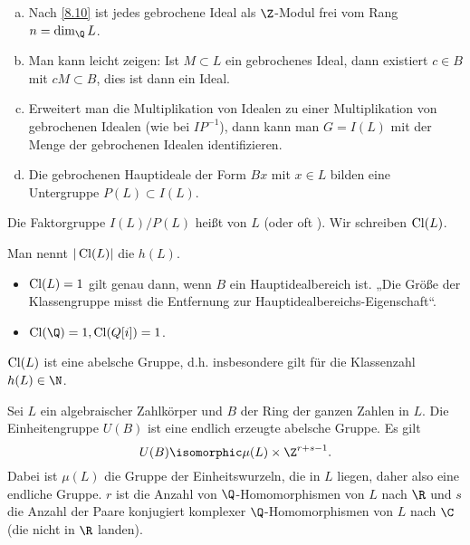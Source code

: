 \begin{nt} \label{8.24}
	\begin{enumerate}[a)]
		\item
			Nach \ref{8.10} ist jedes gebrochene Ideal als $\Z$-Modul frei vom Rang $n = \dim_{\Q} L$.
		\item
			Man kann leicht zeigen:
			Ist $M \subset L$ ein gebrochenes Ideal, dann existiert $c \in B$ mit $cM \subset B$, dies ist dann ein Ideal.
		\item
			Erweitert man die Multiplikation von Idealen zu einer Multiplikation von gebrochenen Idealen (wie bei $IP^{-1}$), dann kann man $G = I(L)$ mit der Menge der gebrochenen Idealen identifizieren.
		\item
			Die gebrochenen Hauptideale der Form $B x$ mit $x \in L$ bilden eine Untergruppe $P(L) \subset I(L)$.
	\end{enumerate}
\end{nt}

\begin{df} \label{8.25}
	Die Faktorgruppe $I(L) / P(L)$ heißt  von $L$ (oder oft ).
	Wir schreiben $\operatorname{Cl}(L)$.

	Man nennt $|\operatorname{Cl}(L)|$ die  $h(L)$.
\end{df}

\begin{nt} \label{8.26}
	\begin{itemize}
		\item
			$\operatorname{Cl}(L) = 1$ gilt genau dann, wenn $B$ ein Hauptidealbereich ist.
			„Die Größe der Klassengruppe misst die Entfernung zur Hauptidealbereichs-Eigenschaft“.
		\item
			$\Cl(\Q) = 1, \Cl(Q[i]) = 1$.
	\end{itemize}
\end{nt}

\begin{st}[Hauptsatz] \label{8.27}
	$\operatorname{Cl}(L)$ ist eine  abelsche Gruppe, d.h. insbesondere gilt für die Klassenzahl $h(L) \in \N$.
\end{st}

\begin{st} \label{8.28}
	Sei $L$ ein algebraischer Zahlkörper und $B$ der Ring der ganzen Zahlen in $L$.
	Die Einheitengruppe $U(B)$ ist eine endlich erzeugte abelsche Gruppe.
	Es gilt
	\[
		U(B) \isomorphic \mu(L) \times \Z^{r+s-1}.
	\]
	Dabei ist $\mu(L)$ die Gruppe der Einheitswurzeln, die in $L$ liegen, daher also eine endliche Gruppe.
	$r$ ist die Anzahl von $\Q$-Homomorphismen von $L$ nach $\R$ und $s$ die Anzahl der Paare konjugiert komplexer $\Q$-Homomorphismen von $L$ nach $\C$ (die nicht in $\R$ landen).
\end{st}

